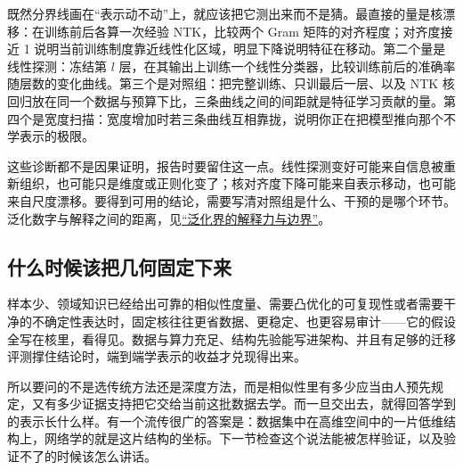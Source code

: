 既然分界线画在``表示动不动''上，就应该把它测出来而不是猜。最直接的量是核漂移：在训练前后各算一次经验 NTK，比较两个 Gram 矩阵的对齐程度；对齐度接近 1 说明当前训练制度靠近线性化区域，明显下降说明特征在移动。第二个量是线性探测：冻结第 \(l\) 层，在其输出上训练一个线性分类器，比较训练前后的准确率随层数的变化曲线。第三个是对照组：把完整训练、只训最后一层、以及 NTK 核回归放在同一个数据与预算下比，三条曲线之间的间距就是特征学习贡献的量。第四个是宽度扫描：宽度增加时若三条曲线互相靠拢，说明你正在把模型推向那个不学表示的极限。

这些诊断都不是因果证明，报告时要留住这一点。线性探测变好可能来自信息被重新组织，也可能只是维度或正则化变了；核对齐度下降可能来自表示移动，也可能来自尺度漂移。要得到可用的结论，需要写清对照组是什么、干预的是哪个环节。泛化数字与解释之间的距离，见\hyperref[sec:13-Machine-Learning/10-Learning-Theory/04]{``泛化界的解释力与边界''}。

\subsection{什么时候该把几何固定下来}

样本少、领域知识已经给出可靠的相似性度量、需要凸优化的可复现性或者需要干净的不确定性表达时，固定核往往更省数据、更稳定、也更容易审计——它的假设全写在核里，看得见。数据与算力充足、结构先验能写进架构、并且有足够的迁移评测撑住结论时，端到端学表示的收益才兑现得出来。

所以要问的不是选传统方法还是深度方法，而是相似性里有多少应当由人预先规定，又有多少证据支持把它交给当前这批数据去学。而一旦交出去，就得回答学到的表示长什么样。有一个流传很广的答案是：数据集中在高维空间中的一片低维结构上，网络学的就是这片结构的坐标。下一节检查这个说法能被怎样验证，以及验证不了的时候该怎么讲话。

